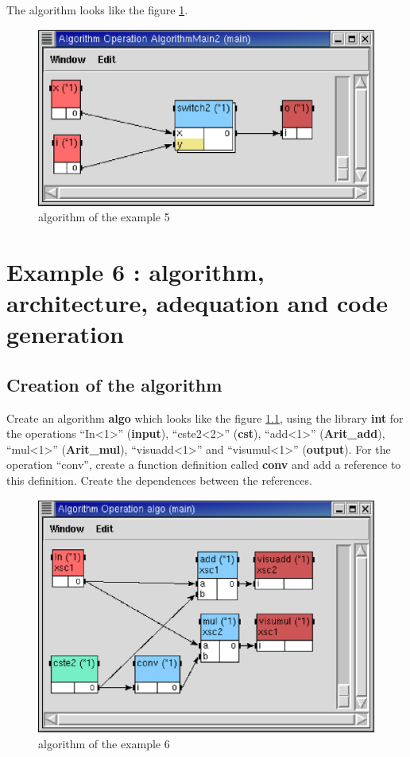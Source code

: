 \documentclass[a4paper,twoside]{report}
\begin{document}
The algorithm looks like the figure \ref{algo5_2}.

\begin{figure}[ht]
  \begin{center} 
        \includegraphics[width=0.52\linewidth]{algorithmMain2_ex5.eps} 
  \end{center}
  \caption{algorithm of the example 5}
  \label{algo5_2}
\end{figure}

\chapter{Example 6 : algorithm, architecture, adequation
and code generation}
\section{Creation of the algorithm}
Create an algorithm \textbf{algo} which looks like the figure \ref{algo6},
using the library \textbf{int} for the operations ``In<1>'' (\textbf{input}),
``cste2<{2}>'' (\textbf{cst}), ``add<1>'' (\textbf{Arit\_add}), ``mul<1>''
(\textbf{Arit\_mul}), ``visuadd<1>'' and ``visumul<1>'' (\textbf{output}). For the
operation ``conv'', create a function definition called \textbf{conv} and add
a reference to this definition. Create the dependences between the references.

\begin{figure}[htbp]
  \begin{center} 
        \includegraphics[width=0.52\linewidth]{algorithm_ex6.eps} 
  \end{center}
  \caption{algorithm of the example 6}
  \label{algo6}
\end{figure}
\end{document}
